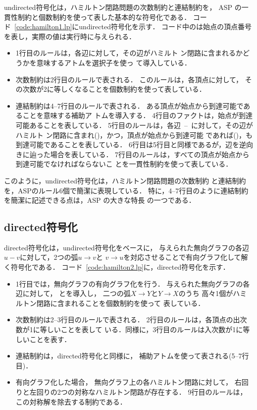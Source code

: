 \textsf{undirected}符号化は，ハミルトン閉路問題の次数制約と連結制約を，
ASP の一貫性制約と個数制約を使って表した基本的な符号化である．
コード~\ref{code:hamilton1.lp}に\textsf{undirected}符号化を示す．
コード中のは始点の頂点番号を表し，実際の値は実行時に与えられる．
\begin{itemize}
\item 1行目のルールは，各辺に対して，その辺がハミルト
  ン閉路に含まれるかどうかを意味するアトムを選択子を使っ
  て導入している．
\item 次数制約は2行目のルールで表される．
  このルールは，各頂点に対して，
  その次数が2に等しくなることを個数制約を使って表している．
\item 連結制約は4--7行目のルールで表される．
  ある頂点が始点から到達可能であることを意味する補助ア
  トムを導入する．
  4行目のファクトは，始点が到達可能あることを表している．
  5行目のルールは，各辺~--~に対して，その辺がハミルト
  ン閉路に含まれ()，かつ，頂点が始点から到達可能
  であれば()，も到達可能であることを表している．
  6行目は5行目と同様であるが，辺を逆向きに辿った場合を表している．
  7行目のルールは，すべての頂点が始点から到達可能でなければならないこ
  とを一貫性制約を使って表している．
\end{itemize}
このように，\textsf{undirected}符号化は，ハミルトン閉路問題の次数制約
と連結制約を，ASPのルール6個で簡潔に表現している．
特に，4--7行目のように連結制約を簡潔に記述できる点は，ASP の大きな特長
の一つである．

\subsection{\textsf{directed}符号化}

\textsf{directed}符号化は，\textsf{undirected}符号化をベースに，
与えられた無向グラフの各辺$u-v$に対して，2つの弧$u\rightarrow v$と
$v\rightarrow u$を対応させることで有向グラフ化して解く符号化である．
コード~\ref{code:hamilton2.lp}に，\textsf{directed}符号化を示す．
\begin{itemize}
\item 1行目では，無向グラフの有向グラフ化を行う．
  与えられた無向グラフの各辺に対して，
  とを導入し，
  二つの弧$X\rightarrow Y$と$Y\rightarrow X$のうち
  高々1個がハミルトン閉路に含まれることを個数制約を使って
  表している．
\item 次数制約は2--3行目のルールで表される．
  2行目のルールは，各頂点の出次数が1に等しいことを表して
  いる．同様に，3行目のルールは入次数が1に等しいことを表す．
\item 連結制約は，\textsf{directed}符号化と同様に，
  補助アトムを使って表される(5--7行目)．
\item 有向グラフ化した場合，
  無向グラフ上の各ハミルトン閉路に対して，
  右回りと左回りの2つの対称なハミルトン閉路が存在する．
  9行目のルールは，この対称解を除去する制約である．
\end{itemize}

